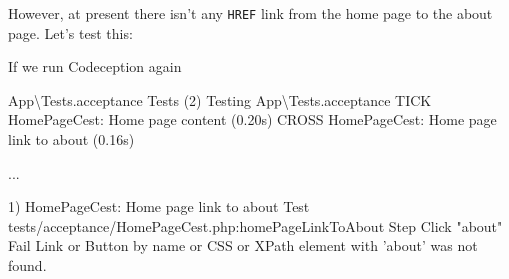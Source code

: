 \documentclass[a4paperpaper,openright]{book}
\newenvironment{Shaded}{}{}
\newcommand{\ExtensionTok}[1]{#1}
\newcommand{\KeywordTok}[1]{\textcolor[rgb]{0.00,0.44,0.13}{\textbf{#1}}}
\newcommand{\NormalTok}[1]{#1}
\newcommand{\OtherTok}[1]{\textcolor[rgb]{0.00,0.44,0.13}{#1}}
\newcommand{\StringTok}[1]{\textcolor[rgb]{0.25,0.44,0.63}{#1}}
\begin{document}
However, at present there isn't any \texttt{HREF} link from the home
page to the about page. Let's test this:

\begin{Shaded}
\end{Shaded}

If we run Codeception again

\begin{Shaded}
\begin{Highlighting}[]
    \ExtensionTok{App}\NormalTok{\textbackslash{}Tests.acceptance Tests (2) }
          \ExtensionTok{Testing}\NormalTok{ App\textbackslash{}Tests.acceptance}
    \ExtensionTok{TICK}\NormalTok{  HomePageCest: Home page content (0.20s)}
    \ExtensionTok{CROSS}\NormalTok{ HomePageCest: Home page link to about (0.16s)}
    
    \ExtensionTok{...}
    
    \ExtensionTok{1}\NormalTok{) }\ExtensionTok{HomePageCest}\NormalTok{: Home page link to about}
     \ExtensionTok{Test}\NormalTok{  tests/acceptance/HomePageCest.php:homePageLinkToAbout}
     \ExtensionTok{Step}\NormalTok{  Click }\StringTok{"about"}
     \ExtensionTok{Fail}\NormalTok{  Link or Button by name or CSS or XPath element with }\StringTok{'about'}\NormalTok{ was not found.}
\end{Highlighting}
\end{Shaded}
\end{document}
